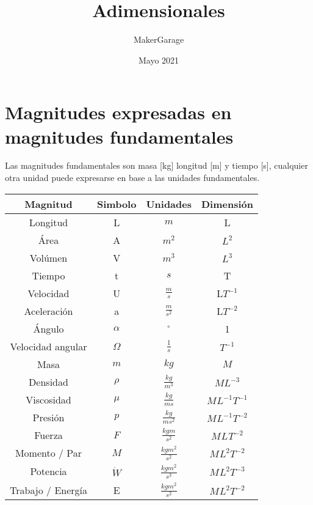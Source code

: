 \documentclass[10pt,a4paper]{article}
\title{Adimensionales}
\author{MakerGarage}
\date{Mayo 2021}
\begin{document}
\maketitle
\newpage
\tableofcontents
\newpage
\setcounter{section}{-1}
\section{Magnitudes expresadas en magnitudes fundamentales}
Las magnitudes fundamentales son masa [kg] longitud [m] y tiempo [s], cualquier otra unidad puede expresarse en base a las unidades fundamentales.

\begin{center}
\begin{tabular}{ c | c | c | c}
  Magnitud  & Simbolo  & Unidades  & Dimensión \\
   \hline
    Longitud & L   & $m$  & L 
    \\\hline
    
    Área & A  & $m^2$  & $L^2$ 
    \\\hline
    
    Volúmen & V  & $m^3$  & $L^3$
    \\\hline
    
    Tiempo & t & $s$  & T 
    \\\hline
    
    Velocidad & U  & $\frac{m}{s}$  & L$T^{-1}$
    \\\hline
    
    Aceleración & a & $\frac{m}{s^2}$ & L$T^{-2}$ 
    \\\hline
    
    Ángulo & $\alpha$ & $^{\circ}$ & 1
    \\\hline
    
   Velocidad angular & $\Omega$ & $\frac{1}{s}$ & $T^{-1}$
   \\\hline
   
    Masa & $m$ & $kg$ & $M$
    \\\hline
    
    Densidad & $\rho$ & $\frac{kg}{m^3}$ & $ML^{-3}$
    \\\hline
    
    Viscosidad & $\mu$ & $\frac{kg}{m s}$ & $M^{}L^{-1}T^{-1}$
    \\\hline
    
    Presión & $p$ & $\frac{kg}{m s^2}$ & $M^{}L^{-1}T^{-2}$
    \\\hline
    
    Fuerza & $F$ & $\frac{kg m}{s^2}$ & $M^{}L^{}T^{-2}$
    \\\hline
    
    Momento / Par & $M$ & $\frac{kg m^2}{s^2}$ & $M^{}L^{2}T^{-2}$
    \\\hline
    
    Potencia & $\dot{W}$ & $\frac{kg m^2}{s^3}$ & $M^{}L^{2}T^{-3}$
    \\\hline
    
    Trabajo / Energía & E & $\frac{kg m^2}{s^2}$ & $M^{}L^{2}T^{-2}$
  
\end{tabular}
\end{center}
\end{document}
